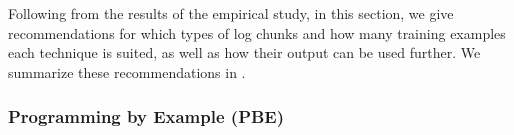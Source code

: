 Following from the results of the empirical study, in this section,
we give recommendations for
which types of log chunks and how many training examples
each technique is suited, as well as
how their output can be used further.
We summarize these recommendations in
.

\begin{table}[tbp]
\caption{Recommendations for each of the investigated chunk retrieval
techniques.}
\label{tab:single-technique-recommendations}

\end{table}

\subsubsection{Programming by Example (PBE)}

